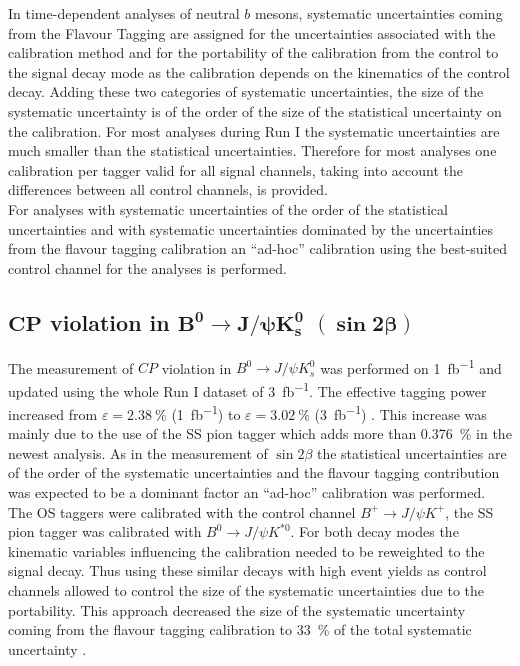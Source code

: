 \documentclass{PoS}
\begin{document}
In time-dependent analyses of neutral $b$ mesons, systematic uncertainties coming from the Flavour Tagging are assigned for the uncertainties associated with the calibration method and for the portability of the calibration from the control to the signal decay mode as the calibration depends on the kinematics of the control decay. Adding these two categories of systematic uncertainties, the size of the systematic uncertainty is of the order of the size of the statistical uncertainty on the calibration.
For most analyses  during Run I the systematic uncertainties are much smaller than the statistical uncertainties. Therefore for most analyses one calibration per tagger valid for all signal channels, taking into account the differences between all control channels, is provided.\\
For analyses with systematic uncertainties of the order of the statistical uncertainties and with systematic uncertainties dominated by the uncertainties from the flavour tagging calibration an \enquote{ad-hoc} calibration using the best-suited control channel for the analyses is performed.

\subsection{$\bm{C\!P}$ violation in $\bm{B^0}\bm{\to} \bm{J\!/\!\psi K_s^0}$ $\pmb{(\sin 2\beta)}$}

The measurement of $C\!P$ violation in $B^0\to J\!/\!\psi K_s^0$ was performed on \SI{1}{fb^{-1}} and updated using the whole Run I dataset of \SI{3}{fb^{-1}}. The effective tagging power increased from $\varepsilon=\SI{2.38}{\%}$ (\SI{1}{fb^{-1}}) \cite{9} to $\varepsilon=\SI{3.02}{\%}$ (\SI{3}{fb^{-1}}) \cite{10}. This increase was mainly due to the use of the SS pion tagger which adds more than \SI{0.376}{\%} in the newest analysis. As in the measurement of $\sin 2\beta$ the statistical uncertainties are of the order of the systematic uncertainties and the flavour tagging contribution was expected to be a dominant factor an \enquote{ad-hoc} calibration was performed. The OS taggers were calibrated with the control channel $B^+\to J\!/\!\psi K^+$, the SS pion tagger was calibrated with $B^0\to J\!/\!\psi K^{*0}$. 
For both decay modes the kinematic variables influencing the calibration needed to be reweighted to the signal decay. Thus using these similar decays with high event yields as control channels allowed to control the size of the systematic uncertainties due to the portability. This approach decreased the size of the systematic uncertainty coming from the flavour tagging calibration to \SI{33}{\%} of the total systematic uncertainty \cite{10}.
\end{document}
